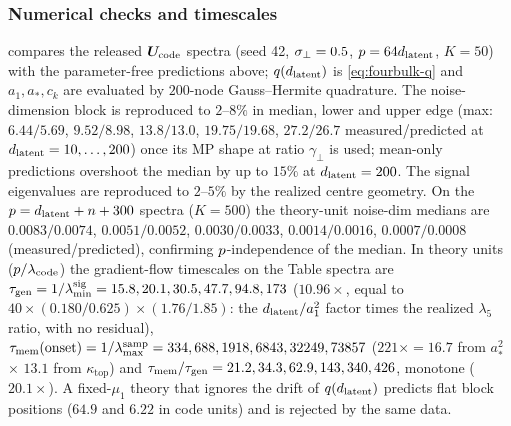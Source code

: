 \subsubsection{Numerical checks and timescales}\label{app:fourbulk-numerics}

 compares the released $\bm{U}_{\mathrm{code}}$ spectra (seed 42, $\sigma_{\perp}=0.5$, $p=64d_{\mathrm{latent}}$, $K=50$) with the parameter-free predictions above; $q(d_{\mathrm{latent}})$ is \eqref{eq:fourbulk-q} and $a_1,a_*,c_k$ are evaluated by $200$-node Gauss--Hermite quadrature. The noise-dimension block is reproduced to $2$--$8\%$ in median, lower and upper edge (max: $6.44/5.69$, $9.52/8.98$, $13.8/13.0$, $19.75/19.68$, $27.2/26.7$ measured/predicted at $d_{\mathrm{latent}}=10,\dots,200$) once its MP shape at ratio $\gamma_\perp$ is used; mean-only predictions overshoot the median by up to $15\%$ at $d_{\mathrm{latent}}=200$. The signal eigenvalues are reproduced to $2$--$5\%$ by the realized centre geometry. On the $p=d_{\mathrm{latent}}+n+300$ spectra ($K=500$) the theory-unit noise-dim medians are $0.0083/0.0074$, $0.0051/0.0052$, $0.0030/0.0033$, $0.0014/0.0016$, $0.0007/0.0008$ (measured/predicted), confirming $p$-independence of the median. In theory units ($p/\lambda_{\mathrm{code}}$) the gradient-flow timescales on the Table spectra are $\tau_{\mathrm{gen}}=1/\lambda^{\mathrm{sig}}_{\min}=15.8,20.1,30.5,47.7,94.8,173$ ($10.96\times$, equal to $40\times(0.180/0.625)\times(1.76/1.85)$: the $d_{\mathrm{latent}}/a_1^2$ factor times the realized $\lambda_5$ ratio, with no residual), $\tau_{\mathrm{mem}}(\text{onset})=1/\lambda^{\mathrm{samp}}_{\max}=334,688,1918,6843,32249,73857$ ($221\times=16.7$ from $a_*^2$ $\times$ $13.1$ from $\kappa_{\mathrm{top}}$) and $\tau_{\mathrm{mem}}/\tau_{\mathrm{gen}}=21.2,34.3,62.9,143,340,426$, monotone ($20.1\times$). A fixed-$\mu_1$ theory that ignores the drift of $q(d_{\mathrm{latent}})$ predicts flat block positions ($64.9$ and $6.22$ in code units) and is rejected by the same data.

